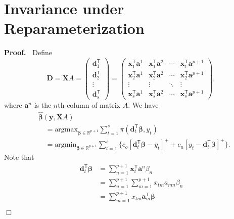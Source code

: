 \documentclass{article}
\newenvironment{proof}
 {\begin{trivlist} \item[] {\bf Proof.\ }}{\hfill$\Box$ \end{trivlist}}
\begin{document}
\section{Invariance under Reparameterization}
\label{app:B}
\begin{proof}
Define
    \[
        \mathbf{D}=\mathbf{X}A
        =\begin{pmatrix}
            \mathbf{d}_1^{\mathsf{T}}\\
            \mathbf{d}_2^{\mathsf{T}}\\
            \vdots\\
            \mathbf{d}_s^{\mathsf{T}}
        \end{pmatrix}
        =\begin{pmatrix}
            \mathbf{x}_{1}^{\mathsf{T}}\mathbf{a}^1&\mathbf{x}_1^{\mathsf{T}}\mathbf{a}^2&\cdots &\mathbf{x}_1^{\mathsf{T}}\mathbf{a}^{p+1}\\
            \mathbf{x}_2^{\mathsf{T}}\mathbf{a}^1&\mathbf{x}_2^{\mathsf{T}}\mathbf{a}^2&\cdots &\mathbf{x}_2^{\mathsf{T}}\mathbf{a}^{p+1}\\
            \vdots &\vdots &\ddots &\vdots \\
            \mathbf{x}_s^{\mathsf{T}}\mathbf{a}^1&\mathbf{x}_s^{\mathsf{T}}\mathbf{a}^2&\cdots &\mathbf{x}_s^{\mathsf{T}}\mathbf{a}^{p+1}
        \end{pmatrix},
    \]
    where $\mathbf{a}^n$ is the $n$th column of matrix $A$. We have
    \[
        \begin{aligned}
            &\hat{\boldsymbol{\beta}}(\mathbf{y},\mathbf{X}A)\\
            &\quad=\text{argmax}_{\boldsymbol{\beta}\in \mathbb{R}^{p+1}}\displaystyle\sum_{t=1}^s{\pi(\mathbf{d}_t^{\mathsf{T}}\boldsymbol{\beta},y_t)}\\
            &\quad=\text{argmin}_{\boldsymbol{\beta}\in \mathbb{R}^{p+1}}\displaystyle\sum_{t=1}^s{\{c_o[\mathbf{d}_t^{\mathsf{T}}\boldsymbol{\beta}-y_t]^{+}+c_u[y_t-\mathbf{d}_t^{\mathsf{T}}\boldsymbol{\beta}]^{+}\}}.
        \end{aligned}
    \]
    Note that
    \[
        \begin{aligned}
            \mathbf{d}_t^{\mathsf{T}}\boldsymbol{\beta}
            &=\displaystyle\sum_{n=1}^{p+1}\mathbf{x}_t^{\mathsf{T}}\mathbf{a}^n\beta_n\\
            &=\displaystyle\sum_{n=1}^{p+1}\displaystyle\sum_{m=1}^{p+1}x_{tm}a_{mn}\beta_n\\
            &=\displaystyle\sum_{m=1}^{p+1}x_{tm}\mathbf{a}_m^{\mathsf{T}}\boldsymbol{\beta}\\

\end{aligned}\]
\end{proof}
\end{document}

